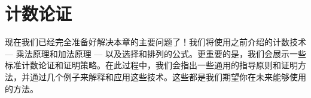 \section{计数论证}

现在我们已经完全准备好解决本章的主要问题了！我们将使用之前介绍的计数技术 --- 乘法原理和加法原理 --- 以及选择和排列的公式。更重要的是，我们会展示一些标准计数论证和证明策略。在此过程中，我们会指出一些通用的指导原则和证明方法，并通过几个例子来解释和应用这些技术。这些都是我们期望你在未来能够使用的方法。







